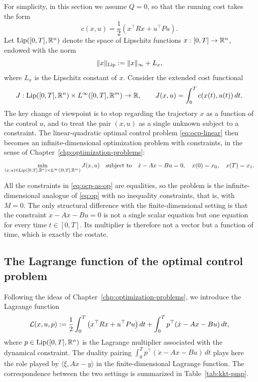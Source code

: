 For simplicity, in this section we assume $Q=0$, so that the running cost takes the form
\begin{equation}
    c(x,u) = \frac{1}{2} \left( x^\top R x + u^\top P u \right).
\end{equation}
Let $\operatorname{Lip}([0,T], \mathbb{R}^n)$ denote the space of Lipschitz functions $x:[0,T]\to \mathbb{R}^n$, endowed with the norm
\begin{equation}
    \|x\|_{\operatorname{Lip}} := \|x\|_\infty + L_x,
\end{equation}
where $L_x$ is the Lipschitz constant of $x$. Consider the extended cost functional
\begin{equation}
    J: \operatorname{Lip}([0,T],\mathbb{R}^n) \times L^\infty([0,T],\mathbb{R}^m) \to \mathbb{R},
    \qquad
    J(x,u) = \int_0^T c(x(t),u(t))\, dt.
\end{equation}
The key change of viewpoint is to stop regarding the trajectory $x$ as a function of the control $u$, and to treat the pair $(x,u)$ as a single unknown subject to a constraint. The linear-quadratic optimal control problem \eqref{eq:ocp-linear} then becomes an infinite-dimensional optimization problem with constraints, in the sense of Chapter~\ref{chp:optimization-problems}:
\begin{equation}
    \label{eq:ocp-as-op}
    \min_{(x,u) \in \operatorname{Lip}([0,T],\mathbb{R}^n) \times L^\infty([0,T],\mathbb{R}^m)}
    J(x,u)
    \quad \text{subject to} \quad
    \dot x - A x - B u = 0, \quad x(0)=x_0, \quad x(T)=x_1.
\end{equation}

All the constraints in \eqref{eq:ocp-as-op} are equalities, so the problem is the infinite-dimensional analogue of \eqref{eq:op} with no inequality constraints, that is, with $M=0$. The only structural difference with the finite-dimensional setting is that the constraint $\dot x - Ax - Bu=0$ is not a single scalar equation but one equation for every time $t\in[0,T]$. Its multiplier is therefore not a vector but a function of time, which is exactly the costate.

\subsection{The Lagrange function of the optimal control problem}

Following the ideas of Chapter~\ref{chp:optimization-problems}, we introduce the Lagrange function
\begin{equation}
    \label{eq:ocp-lagrangian}
    \mathcal{L}(x,u,p) := \frac12 \int_0^T \big( x^\top R x + u^\top P u \big)\, dt
    + \int_0^T p^\top (\dot x - A x - B u)\, dt,
\end{equation}
where $p \in \operatorname{Lip}([0,T], \mathbb{R}^n)$ is the Lagrange multiplier associated with the dynamical constraint. The duality pairing $\int_0^T p^\top(\dot x - Ax-Bu)\, dt$ plays here the role played by $\langle \xi, Ax-y\rangle$ in the finite-dimensional Lagrange function. The correspondence between the two settings is summarized in Table~\ref{tab:kkt-pmp}.

